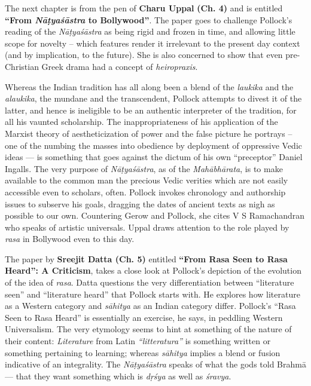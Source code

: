 The next chapter is from the pen of {\bf Charu Uppal} {\bf(Ch. 4)} and is entitled {\bf “From \textsl{Nāṭyaśāstra} to Bollywood''}. The paper goes to challenge Pollock’s reading of the \textsl{Nāṭyaśāstra} as being rigid and frozen in time, and allowing little scope for novelty -- which features render it irrelevant to the present day context (and by implication, to the future). She is also concerned to show that even pre-Christian Greek drama had a concept of \textsl{heiropraxis}.

Whereas the Indian tradition has all along been a blend of the \textsl{laukika} and the \textsl{alaukika}, the mundane and the transcendent, Pollock attempts to divest it of the latter, and hence is ineligible to be an authentic interpreter of the tradition, for all his vaunted scholarship. The inappropriateness of his application of the Marxist theory of aestheticization of power and the false picture he portrays -- one of the numbing the masses into obedience by deployment of oppressive Vedic ideas --- is something that goes against the dictum of his own “preceptor” Daniel Ingalls. The very purpose of \textsl{Nāṭyaśāstra}, as of the \textsl{Mahābhārata}, is to make available to the common man the precious Vedic verities which are not easily accessible even to scholars, often. Pollock invokes chronology and authorship issues to subserve his goals, dragging the dates of ancient texts as nigh as possible to our own. Countering Gerow and Pollock, she cites V S Ramachandran who speaks of artistic universals. Uppal draws attention to the role played by \textsl{rasa} in Bollywood even to this day.

The paper by {\bf Sreejit Datta (Ch. 5)} entitled {\bf “From Rasa Seen to Rasa Heard”: A Criticism}, takes a close look at Pollock’s depiction of the evolution of the idea of \textsl{rasa}. Datta questions the very differentiation between “literature seen” and “literature heard” that Pollock starts with. He explores how literature as a Western category and \textsl{sāhitya} as an Indian category differ. Pollock’s “Rasa Seen to Rasa Heard” is essentially an exercise, he says, in peddling Western Universalism. The very etymology seems to hint at something of the nature of their content: \textsl{Literature} from Latin \textsl{“litteratura”} is something written or something pertaining to learning; whereas \textsl{sāhitya} implies a blend or fusion indicative of an integrality. The \textsl{Nāṭyaśāstra} speaks of what the gods told Brahmā --- that they want something which is \textsl{dṛśya} as well as \textsl{śravya}.

